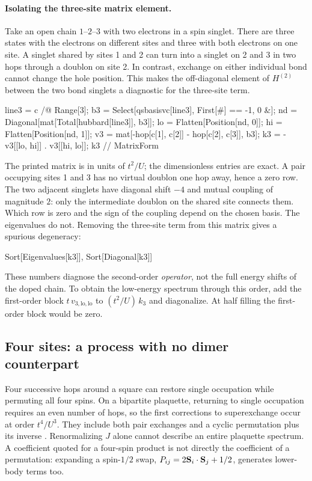 \paragraph{Isolating the three-site matrix element.}
Take an open chain $1$--$2$--$3$ with two electrons in a spin singlet.
There are three states with the electrons on different sites and three
with both electrons on one site. A singlet shared by sites 1 and 2 can
turn into a singlet on 2 and 3 in two hops through a doublon on site 2.
In contrast, exchange on either individual bond cannot change the hole
position. This makes the off-diagonal element of $H^{(2)}$ between
the two bond singlets a diagnostic for the three-site term.
\begin{wl}
line3 = c /@ Range[3];
b3 = Select[qsbasisvc[line3], First[#] == {-1, 0} &];
nd = Diagonal[mat[Total[hubbard[line3]], b3]];
lo = Flatten[Position[nd, 0]]; hi = Flatten[Position[nd, 1]];
v3 = mat[-hop[c[1], c[2]] - hop[c[2], c[3]], b3];
k3 = -v3[[lo, hi]] . v3[[hi, lo]];
k3 // MatrixForm
\end{wl}
The printed matrix is in units of $t^2/U$; the dimensionless entries
are exact. A pair occupying sites 1 and 3 has no virtual doublon one
hop away, hence a zero row. The two adjacent singlets have diagonal
shift $-4$ and mutual coupling of magnitude $2$: only the intermediate
doublon on the shared site connects them. Which row is zero and the
sign of the coupling depend on the chosen basis. The eigenvalues do
not. Removing the three-site term from this matrix gives a
spurious degeneracy:
\begin{wl}
{Sort[Eigenvalues[k3]], Sort[Diagonal[k3]]}
\end{wl}
These numbers diagnose the second-order \emph{operator}, not the full
energy shifts of the doped chain. To obtain the low-energy spectrum
through this order, add the first-order block $t\,v_{3,\mathrm{lo},\mathrm{lo}}$
to $(t^2/U)\,k_3$ and diagonalize. At half filling the first-order
block would be zero.

\subsection{Four sites: a process with no dimer counterpart}
Four successive hops around a square can restore single occupation
while permuting all four spins. On a bipartite plaquette, returning to
single occupation requires an even number of hops, so the first
corrections to superexchange occur at order $t^4/U^3$. They include
both pair exchanges and a cyclic permutation plus its inverse
\cite{macdonald}. Renormalizing $J$ alone cannot describe an entire
plaquette spectrum. A coefficient quoted for a four-spin product is
not directly the coefficient of a permutation: expanding a spin-$1/2$
swap, $P_{ij}=2\mathbf{S}_i\cdot\mathbf{S}_j+1/2$, generates lower-body terms too.

